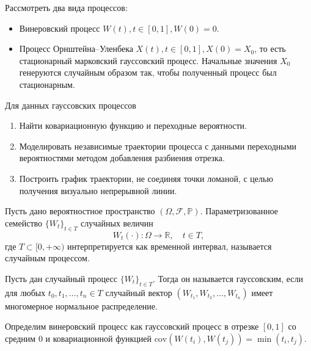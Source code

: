 Рассмотреть два вида процессов:
\begin{itemize}
	\item Винеровский процесс \( W(t), t\in[0,1], W(0) = 0 \).
	
	\item Процесс Орнштейна--Уленбека \( X(t), t\in[0,1], X(0) = X_0 \), 
     то есть стационарный марковский гауссовский процесс. Начальные 
     значения \( X_0 \) генеруются случайным образом так, чтобы полученный 
     процесс был стационарным.
	
\end{itemize}

Для данных гауссовских процессов
\begin{enumerate}
	\item Найти ковариационную функцию и переходные вероятности.
	
	\item Моделировать независимые траектории процесса с данными 
     переходными вероятностями методом добавления разбиения отрезка.
	
	\item Построить график траектории, не соединяя точки ломаной, с целью 
     получения визуально непрерывной линии.
\end{enumerate}

 

\begin{definition}
	Пусть дано вероятностное пространство \( (\Omega,\mathcal{F}, 
    \mathbb{P}) \). Параметризованное семейство \( \lbrace W_t\rbrace_{t \in 
     T} \) случайных величин
	\[
	 W_t(\cdot): \Omega \to \mathbb{R}, \quad t \in T,
	\]
	где \( T \subset[0, +\infty) \) интерпретируется как временной интервал, 
     называется случайным процессом.
\end{definition}
\begin{definition}
	Пусть дан случайный процесс \( \lbrace W_t \rbrace_{t\in T} \). Тогда 
     он называется гауссовским, если для любых \( t_0,t_1, \dots, t_n \in T \) 
     случайный вектор \( (W_{t_1}, W_{t_2}, \dots, W_{t_n}) \) имеет 
     многомерное нормальное распределение.
\end{definition}

Определим винеровский процесс как гауссовский процесс в отрезке 
 \( [0,1] \) со средним \( 0 \) и ковариационной функцией \( \text{cov} 
 \left(W(t_i), W(t_j) \right) = \min \left( t_i, t_j \right) \).

